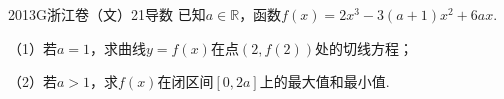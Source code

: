 
\begin{problem}{2013}{G}{浙江卷（文）}{21}{导数}
已知$a\in\mathbb{R}$，函数$f(x)=2x^3-3(a+1)x^2+6ax$.

（1）若$a=1$，求曲线$y=f(x)$在点$(2,f(2))$处的切线方程；

（2）若$a>1$，求$f(x)$在闭区间$[0,2a]$上的最大值和最小值.
\end{problem}